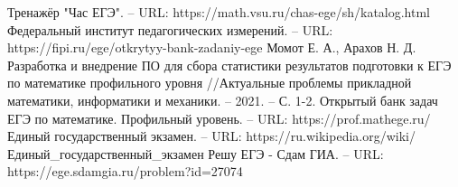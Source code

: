 \begin{thebibliography}{6}
	 Тренажёр "Час ЕГЭ". – URL: https://math.vsu.ru/chas-ege/sh/katalog.html
	Федеральный институт педагогических измерений. – URL:  https://fipi.ru/ege/otkrytyy-bank-zadaniy-ege
	Момот Е. А., Арахов Н. Д. Разработка и внедрение ПО для сбора статистики результатов подготовки к ЕГЭ по математике профильного уровня //Актуальные проблемы прикладной математики, информатики и механики. – 2021. – С. 1-2.
	Открытый банк задач ЕГЭ по математике. Профильный уровень. – URL:  https://prof.mathege.ru/
	 Единый государственный экзамен. – URL:  https://ru.wikipedia.org/wiki/Единый\_государственный\_экзамен
	Решу ЕГЭ - Сдам ГИА. – URL: https://ege.sdamgia.ru/problem?id=27074
\end{thebibliography}
